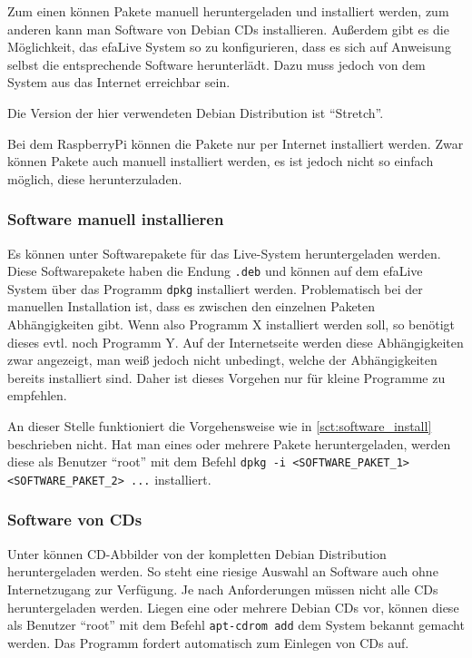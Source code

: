 \documentclass[a4paper,12pt,twoside]{article}
\begin{document}
Zum einen können Pakete manuell heruntergeladen und installiert werden,
zum anderen kann man Software von Debian CDs installieren. Außerdem
gibt es die Möglichkeit, das efaLive System so zu konfigurieren, dass
es sich auf Anweisung selbst die entsprechende Software herunterlädt.
Dazu muss jedoch von dem System aus das Internet erreichbar sein.

Die Version der hier verwendeten Debian Distribution ist "`Stretch"'.

Bei dem RaspberryPi können die Pakete nur per Internet installiert werden. 
Zwar können Pakete auch manuell installiert werden, es ist jedoch nicht 
so einfach möglich, diese herunterzuladen.


\subsubsection{Software manuell installieren}
\label{sct:software_manuell}
Es können unter \cite{DEB3} Softwarepakete für das Live-System
heruntergeladen werden. Diese Softwarepakete haben die Endung
\texttt{.deb} und können auf dem efaLive System
über das Programm \texttt{dpkg} installiert werden. Problematisch bei der
manuellen Installation ist, dass es zwischen den einzelnen Paketen
Abhängigkeiten gibt. Wenn also Programm X installiert werden soll, so
benötigt dieses evtl. noch Programm Y. Auf der Internetseite werden
diese Abhängigkeiten zwar angezeigt, man weiß jedoch nicht unbedingt,
welche der Abhängigkeiten bereits installiert sind. Daher ist dieses
Vorgehen nur für kleine Programme zu empfehlen.

An dieser Stelle funktioniert die Vorgehensweise wie in \ref{sct:software_install}
beschrieben nicht. Hat man eines oder mehrere Pakete heruntergeladen,
werden diese als Benutzer "`root"' mit dem
Befehl \texttt{dpkg -i {\textless}SOFTWARE\_PAKET\_1{\textgreater}
{\textless}SOFTWARE\_PAKET\_2{\textgreater} ...} installiert. 


\subsubsection{Software von CDs}
\label{sct:software_cd}
Unter \cite{DEB4} können CD-Abbilder von der kompletten Debian
Distribution heruntergeladen werden. So steht eine riesige Auswahl an
Software auch ohne Internetzugang zur Verfügung. Je nach Anforderungen
müssen nicht alle CDs heruntergeladen werden. Liegen eine oder mehrere
Debian CDs vor, können diese als Benutzer
"`root"' mit dem Befehl
\texttt{apt-cdrom add} dem System bekannt gemacht
werden. Das Programm fordert automatisch zum Einlegen von CDs auf.
\end{document}
